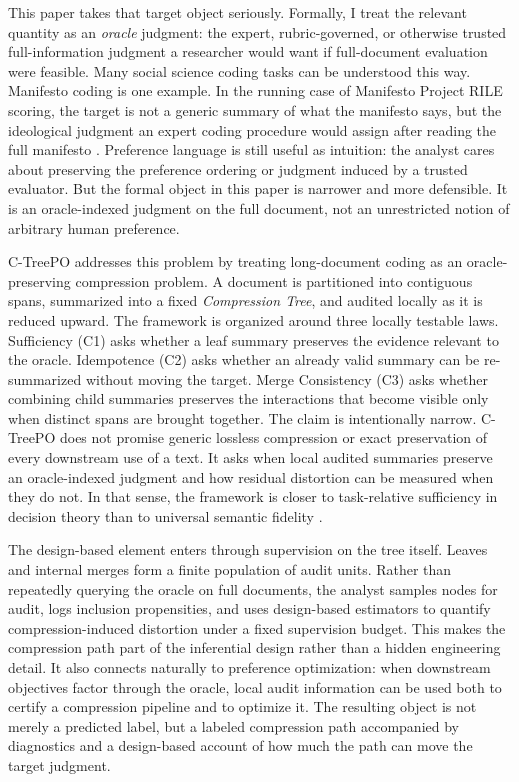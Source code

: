 \documentclass[11pt]{article}
\begin{document}
This paper takes that target object seriously. Formally, I treat the relevant quantity as an \emph{oracle} judgment: the expert, rubric-governed, or otherwise trusted full-information judgment a researcher would want if full-document evaluation were feasible. Many social science coding tasks can be understood this way. Manifesto coding is one example. In the running case of Manifesto Project RILE scoring, the target is not a generic summary of what the manifesto says, but the ideological judgment an expert coding procedure would assign after reading the full manifesto \citep{ManifestoProject2025a}. Preference language is still useful as intuition: the analyst cares about preserving the preference ordering or judgment induced by a trusted evaluator. But the formal object in this paper is narrower and more defensible. It is an oracle-indexed judgment on the full document, not an unrestricted notion of arbitrary human preference.

C-TreePO addresses this problem by treating long-document coding as an oracle-preserving compression problem. A document is partitioned into contiguous spans, summarized into a fixed \emph{Compression Tree}, and audited locally as it is reduced upward. The framework is organized around three locally testable laws. Sufficiency (C1) asks whether a leaf summary preserves the evidence relevant to the oracle. Idempotence (C2) asks whether an already valid summary can be re-summarized without moving the target. Merge Consistency (C3) asks whether combining child summaries preserves the interactions that become visible only when distinct spans are brought together. The claim is intentionally narrow. C-TreePO does not promise generic lossless compression or exact preservation of every downstream use of a text. It asks when local audited summaries preserve an oracle-indexed judgment and how residual distortion can be measured when they do not. In that sense, the framework is closer to task-relative sufficiency in decision theory than to universal semantic fidelity \citep{Blackwell1953}.

The design-based element enters through supervision on the tree itself. Leaves and internal merges form a finite population of audit units. Rather than repeatedly querying the oracle on full documents, the analyst samples nodes for audit, logs inclusion propensities, and uses design-based estimators to quantify compression-induced distortion under a fixed supervision budget. This makes the compression path part of the inferential design rather than a hidden engineering detail. It also connects naturally to preference optimization: when downstream objectives factor through the oracle, local audit information can be used both to certify a compression pipeline and to optimize it. The resulting object is not merely a predicted label, but a labeled compression path accompanied by diagnostics and a design-based account of how much the path can move the target judgment.
\end{document}
